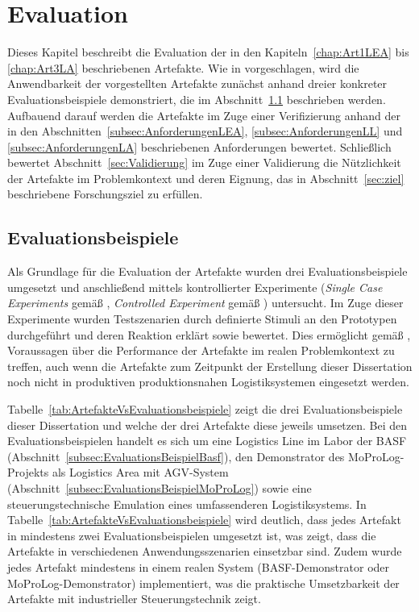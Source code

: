 
\chapter{Evaluation}
\label{chap:evaluation}

Dieses Kapitel beschreibt die Evaluation der in den Kapiteln~\ref{chap:Art1LEA} bis \ref{chap:Art3LA} beschriebenen Artefakte. Wie in \cite{Peffers.2007} vorgeschlagen, wird die Anwendbarkeit der vorgestellten Artefakte zunächst anhand dreier konkreter Evaluationsbeispiele demonstriert, die im Abschnitt~\ref{sec:Evaluationsbeispiele} beschrieben werden. Aufbauend darauf werden die Artefakte im Zuge einer Verifizierung anhand der in den Abschnitten~\ref{subsec:AnforderungenLEA}, \ref{subsec:AnforderungenLL} und \ref{subsec:AnforderungenLA} beschriebenen Anforderungen bewertet. Schließlich bewertet Abschnitt~\ref{sec:Validierung} im Zuge einer Validierung die Nützlichkeit der Artefakte im Problemkontext und deren Eignung, das in Abschnitt~\ref{sec:ziel} beschriebene Forschungsziel zu erfüllen. 

\section{Evaluationsbeispiele}
\label{sec:Evaluationsbeispiele}

Als Grundlage für die Evaluation der Artefakte wurden drei Evaluationsbeispiele umgesetzt und anschließend mittels kontrollierter Experimente (\emph{Single Case Experiments} gemäß \cite{Wieringa.2014}, \emph{Controlled Experiment} gemäß \cite{Hevner.2004}) untersucht. Im Zuge dieser Experimente wurden Testszenarien durch definierte Stimuli an den Prototypen durchgeführt und deren Reaktion erklärt sowie bewertet. Dies ermöglicht gemäß \cite{Wieringa.2014}, Voraussagen über die Performance der Artefakte im realen Problemkontext zu treffen, auch wenn die Artefakte zum Zeitpunkt der Erstellung dieser Dissertation noch nicht in produktiven produktionsnahen Logistiksystemen eingesetzt werden.
 
Tabelle~\ref{tab:ArtefakteVsEvaluationsbeispiele} zeigt die drei Evaluationsbeispiele dieser Dissertation und welche der drei Artefakte diese jeweils umsetzen. Bei den Evaluationsbeispielen handelt es sich um eine Logistics Line im Labor der BASF (Abschnitt~\ref{subsec:EvaluationsBeispielBasf}), den Demonstrator des MoProLog-Projekts als Logistics Area mit AGV-System (Abschnitt~\ref{subsec:EvaluationsBeispielMoProLog}) sowie eine steuerungstechnische Emulation eines umfassenderen Logistiksystems. In Tabelle~\ref{tab:ArtefakteVsEvaluationsbeispiele} wird deutlich, dass jedes Artefakt in mindestens zwei Evaluationsbeispielen umgesetzt ist, was zeigt, dass die Artefakte in verschiedenen Anwendungsszenarien einsetzbar sind. Zudem wurde jedes Artefakt mindestens in einem realen System (BASF-Demonstrator oder MoProLog-Demonstrator) implementiert, was die praktische Umsetzbarkeit der Artefakte mit industrieller Steuerungstechnik zeigt.

